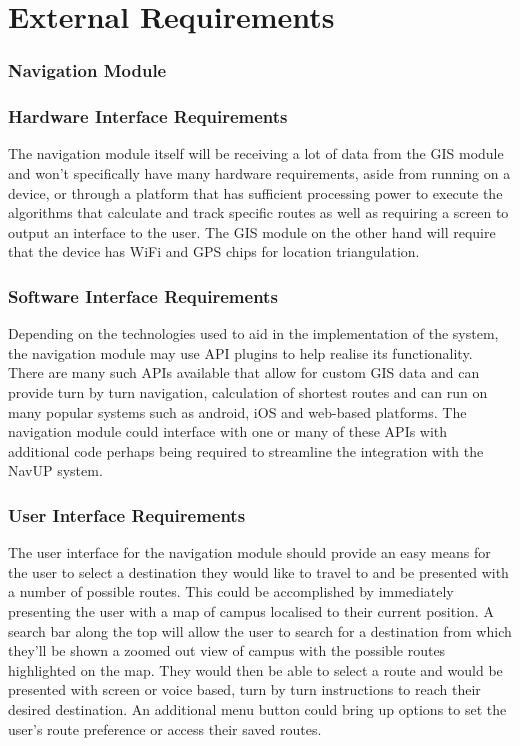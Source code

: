 \documentclass[11pt]{article}
\begin{document}
\section{External Requirements}

\subsubsection{Navigation Module}
\subsubsection{Hardware Interface Requirements}
  
The navigation module itself will be receiving a lot of data from the GIS module and won’t specifically have many hardware requirements,  aside from running on a device, or through a platform that has sufficient processing power to execute the algorithms that calculate and track specific routes as well as requiring a screen to output an interface to the user. The GIS module on the other hand will require that the device has WiFi and GPS chips for location triangulation.
  
 \subsubsection{Software Interface Requirements}
  
Depending on the technologies used to aid in the implementation of the system, the navigation module may use API plugins to help realise its functionality. There are many such APIs available that allow for custom GIS data and can provide turn by turn navigation, calculation of shortest routes and can run on many popular systems such as android, iOS and web-based platforms. The navigation module could interface with one or many of these APIs with additional code perhaps being required to streamline the integration with the NavUP system.
  
 \subsubsection{User Interface Requirements}
  
The user interface for the navigation module should provide an easy means for the user to select a destination they would like to travel to and be presented with a number of possible routes. This could be accomplished by immediately presenting the user with a map of campus localised to their current position. A search bar along the top will allow the user to search for a destination from which they’ll be shown a zoomed out view of campus with the possible routes highlighted on the map. They would then be able to select a route and would be presented with screen or voice based, turn by turn instructions to reach their desired destination. An additional menu button could bring up options to set the user’s route preference or access their saved routes.
  
\end{document}
